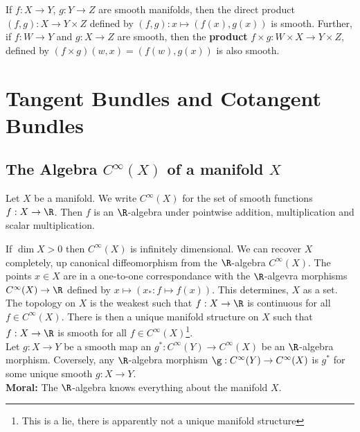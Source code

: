 \noindent
If $f : X \to Y$, $g : Y \to Z$ are smooth manifolds, then the direct product $(f, g) : X \to Y \times Z$ defined by $(f, g) : x \mapsto (f(x), g(x))$ is smooth. Further, if $f : W \to Y$ and $g : X \to Z$ are smooth, then the \textbf{product} $f \times g : W \times X \to Y \times Z$, defined by $(f \times g) (w, x) = (f(w), g(x))$ is also smooth.

\section{Tangent Bundles and Cotangent Bundles}
\subsection{The Algebra $C^\infty(X)$ of a manifold $X$}

\begin{ndefi}[]
  Let $X$ be a manifold. We write $C^\infty(X)$ for the set of smooth functions $f : X\to \R$. Then $f$ is an $\R$-algebra under pointwise addition, multiplication and scalar multiplication.
\end{ndefi}

\noindent
If $\dim X > 0$ then $C^\infty(X)$ is infinitely dimensional. We can recover $X$ completely, up canonical diffeomorphism from the $\R$-algebra $C^\infty(X)$. The points $x \in X$ are in a one-to-one correspondance with the $\R$-algevra morphisms $C^\infty(X) \to \R$ defined by $x \mapsto (x_* : f \mapsto f(x))$. This determines, $X$ as a set.\\

\noindent
The topology on $X$ is the weakest such that $f : X \to \R$ is continuous for all $f \in C^{\infty}(X)$. There is then a unique manifold structure on $X$ such that $f : X \to \R$ is smooth for all $f \in C^\infty(X)$\footnote{This is a lie, there is apparently not a unique manifold structure}.\\

\noindent
Let $g : X \to Y$ be a smooth map an $g^* : C^\infty(Y) \to C^\infty(X)$ be an $\R$-algebra morphism. Coversely, any $\R$-algebra morphism $\g: C^\infty(Y) \to C^\infty(X)$ is $g^*$ for some unique smooth $g : X \to Y$.\\

\noindent
\textbf{Moral:} The $\R$-algebra knows everything about the manifold $X$.

